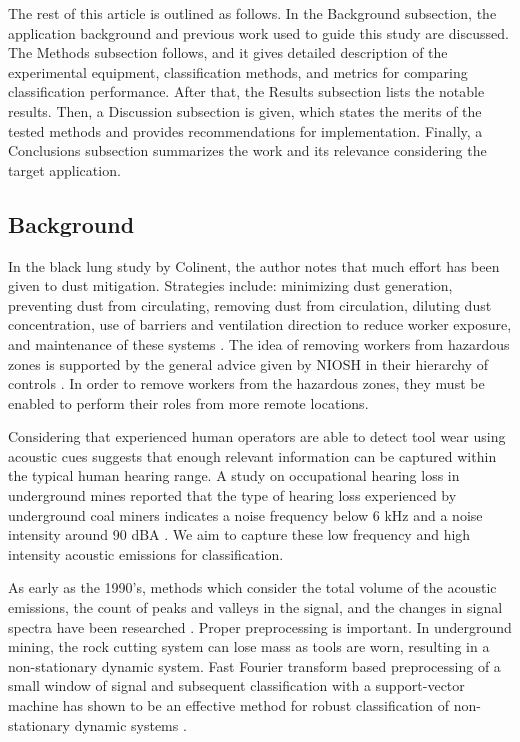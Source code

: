 The rest of this article is outlined as follows. 
In the Background subsection, the application background
 and previous work used to guide this study are discussed.
The Methods subsection follows, and it gives detailed description of the 
 experimental equipment, classification methods, and metrics for comparing classification performance.
After that, the Results subsection lists the notable results.
Then, a Discussion subsection is given, which states the merits of the tested methods 
 and provides recommendations for implementation.
Finally, a Conclusions subsection summarizes the work and its relevance considering the target application.

\subsection{Background}\label{sec1a}

In the black lung study by Colinent, the author notes that much effort has been given to dust mitigation.
Strategies include: minimizing dust generation, preventing dust from circulating, removing
dust from circulation, diluting dust concentration, use of barriers and ventilation direction
to reduce worker exposure, and maintenance of these systems \cite{Colinent2020}. 
The idea of removing workers from hazardous zones is supported 
 by the general advice given by NIOSH in their hierarchy of controls \cite{niosh_2015}.
In order to remove workers from the hazardous zones, they must be enabled to perform their roles from 
more remote locations. 

Considering that experienced human operators are able to detect tool wear using acoustic cues
suggests that enough relevant information can be captured within the typical human hearing range.
A study on occupational hearing loss in underground mines reported that the type of hearing loss experienced 
by underground coal miners indicates a noise frequency below 6 kHz and a noise intensity 
around 90 dBA \cite{Erol2022}. 
We aim to capture these low frequency and high intensity acoustic emissions for classification.

As early as the 1990's, methods which consider the total volume of the acoustic emissions,
the count of peaks and valleys in the signal, and the changes in signal spectra 
have been researched \cite{Tan1992,Kakade1995}.
Proper preprocessing is important. 
In underground mining, the rock cutting system can lose mass as tools are worn,
resulting in a non-stationary dynamic system.
Fast Fourier transform based preprocessing of a small window of signal
 and subsequent classification with a support-vector machine has shown 
 to be an effective method for robust classification of non-stationary dynamic systems \cite{xu2016fftsvm}.

